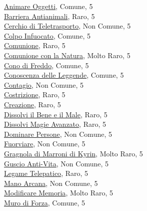 \begin{multicols}{3}
{{\hyperlink{Animare Oggetti}{Animare Oggetti}, Comune, 5\\
\hyperlink{Barriera Antianimali}{Barriera Antianimali}, Raro, 5\\
\hyperlink{Cerchio di Teletrasporto}{Cerchio di Teletrasporto}, Non Comune, 5\\
\hyperlink{Colpo Infuocato}{Colpo Infuocato}, Comune, 5\\
\hyperlink{Comunione}{Comunione}, Raro, 5\\
\hyperlink{Comunione con la Natura}{Comunione con la Natura}, Molto Raro, 5\\
\hyperlink{Cono di Freddo}{Cono di Freddo}, Comune, 5\\
\hyperlink{Conoscenza delle Leggende}{Conoscenza delle Leggende}, Comune, 5\\
\hyperlink{Contagio}{Contagio}, Non Comune, 5\\
\hyperlink{Costrizione}{Costrizione}, Raro, 5\\
\hyperlink{Creazione}{Creazione}, Raro, 5\\
\hyperlink{Dissolvi il Bene e il Male}{Dissolvi il Bene e il Male}, Raro, 5\\
\hyperlink{Dissolvi Magie Avanzato}{Dissolvi Magie Avanzato}, Raro, 5\\
\hyperlink{Dominare Persone}{Dominare Persone}, Non Comune, 5\\
\hyperlink{Fuorviare}{Fuorviare}, Non Comune, 5\\
\hyperlink{Gragnola di Marroni di Kyrin}{Gragnola di Marroni di Kyrin}, Molto Raro, 5\\
\hyperlink{Guscio Anti-Vita}{Guscio Anti-Vita}, Non Comune, 5\\
\hyperlink{Legame Telepatico}{Legame Telepatico}, Raro, 5\\
\hyperlink{Mano Arcana}{Mano Arcana}, Non Comune, 5\\
\hyperlink{Modificare Memoria}{Modificare Memoria}, Molto Raro, 5\\
\hyperlink{Muro di Forza}{Muro di Forza}, Comune, 5\\
}}
\end{multicols}
